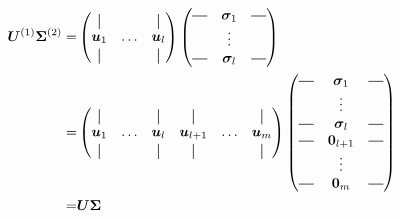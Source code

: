 \begin{align}
    \bm{U}^{(1)} \bm{\Sigma}^{(2)} =&
    \begin{pmatrix}
    \vertbar &        & \vertbar \\
    \bm{u}_1 & \hdots & \bm{u}_l \\
    \vertbar &        & \vertbar 
    \end{pmatrix}
    \begin{pmatrix}
        \horzbar & \bm{\sigma}_1     & \horzbar \\
                    & \vdots            &          \\
        \horzbar & \bm{\sigma}_l     & \horzbar \\
    \end{pmatrix} \\
    =&\begin{pmatrix}
        \vertbar &        & \vertbar & \vertbar &        & \vertbar \\
        \bm{u}_1 & \hdots & \bm{u}_l & \bm{u}_{l+1} & \hdots & \bm{u}_m \\
        \vertbar &        & \vertbar & \vertbar &        & \vertbar \\
        \end{pmatrix}
        \begin{pmatrix}
            \horzbar & \bm{\sigma}_1     & \horzbar  \\
                        & \vdots            &           \\
            \horzbar & \bm{\sigma}_l     &  \horzbar \\
            \horzbar & \bm{0}_{l+1} & \horzbar  \\
                        & \vdots            &           \\
            \horzbar & \bm{0}_m     &  \horzbar \\
    \end{pmatrix} \\
    =& \bm{U \Sigma}
\end{align}
\allowdisplaybreaks

